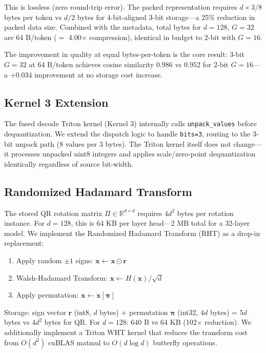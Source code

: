 \documentclass{article}
\newcommand{\bm}[1]{\boldsymbol{#1}}
\newcommand{\R}{\mathbb{R}}
\begin{document}
This is lossless (zero round-trip error). The packed representation requires $d \times 3 / 8$ bytes per token vs $d / 2$ bytes for 4-bit-aligned 3-bit storage—a 25\% reduction in packed data size. Combined with the metadata, total bytes for $d=128$, $G=32$ are 64 B/token ($=$ 4.00$\times$ compression), identical in budget to 2-bit with $G=16$.

The improvement in quality at equal bytes-per-token is the core result: 3-bit $G=32$ at 64 B/token achieves cosine similarity 0.986 vs 0.952 for 2-bit $G=16$—a $+0.034$ improvement at no storage cost increase.

\subsection{Kernel 3 Extension}
The fused decode Triton kernel (Kernel 3) internally calls \texttt{unpack\_values} before dequantization. We extend the dispatch logic to handle \texttt{bits=3}, routing to the 3-bit unpack path (8 values per 3 bytes). The Triton kernel itself does not change—it processes unpacked uint8 integers and applies scale/zero-point dequantization identically regardless of source bit-width.

\subsection{Randomized Hadamard Transform}
\label{sec:rht_method}

The stored QR rotation matrix $\Pi \in \R^{d \times d}$ requires $4d^2$ bytes per rotation instance. For $d=128$, this is 64 KB per layer head—2 MB total for a 32-layer model. We implement the Randomized Hadamard Transform (RHT) as a drop-in replacement:
\begin{enumerate}
\item Apply random $\pm 1$ signs: $\bm{x} \leftarrow \bm{x} \odot \bm{r}$
\item Walsh-Hadamard Transform: $\bm{x} \leftarrow H(\bm{x}) / \sqrt{d}$
\item Apply permutation: $\bm{x} \leftarrow \bm{x}[\bm{\pi}]$
\end{enumerate}
Storage: sign vector $\bm{r}$ (int8, $d$ bytes) + permutation $\bm{\pi}$ (int32, $4d$ bytes) = $5d$ bytes vs $4d^2$ bytes for QR. For $d=128$: 640 B vs 64 KB (102$\times$ reduction). We additionally implement a Triton WHT kernel that reduces the transform cost from $O(d^2)$ cuBLAS matmul to $O(d \log d)$ butterfly operations.

\end{document}
